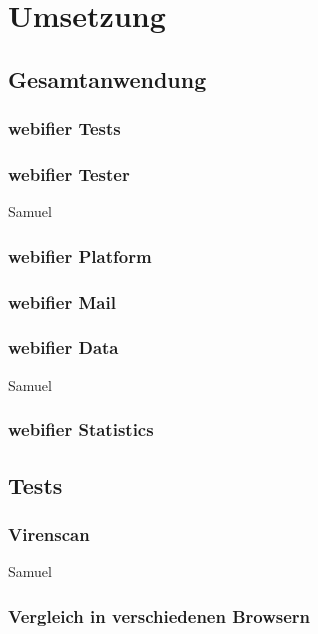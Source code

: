 \chapter{Umsetzung}
\section{Gesamtanwendung}

\subsection{webifier Tests}

\subsection{webifier Tester}

\todo Samuel

\subsection{webifier Platform}

\subsection{webifier Mail}

\subsection{webifier Data}

\todo Samuel

\subsection{webifier Statistics}

\section{Tests}

\subsection{Virenscan}

\todo Samuel

\subsection{Vergleich in verschiedenen Browsern}

